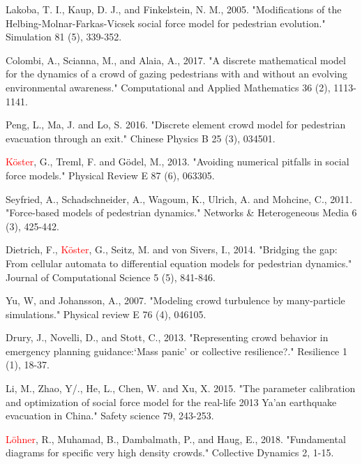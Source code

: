 \documentclass[preprint,12pt]{elsarticle}
\begin{document}
\begin{thebibliography}{10}
Lakoba, T. I., Kaup, D. J., and Finkelstein, N. M., 2005. "Modifications of the 
Helbing-Molnar-Farkas-Vicsek social force model for pedestrian evolution." 
Simulation 81 (5), 339-352.
{}

Colombi, A., Scianna, M., and Alaia, A., 2017. "A discrete 
mathematical model for the dynamics of a crowd of gazing pedestrians with and 
without an evolving environmental awareness." Computational and Applied 
Mathematics 36 (2), 1113-1141.
{}

Peng, L., Ma, J. and Lo, S. 2016. "Discrete element crowd model for 
pedestrian evacuation through an exit." Chinese Physics B 25 (3), 034501.
{}

\textcolor{red}{K\"oster}, G., Treml, F. and G\"odel, M., 2013. "Avoiding 
numerical pitfalls in social force models." Physical Review E 87 (6), 063305.
{}

Seyfried, A., Schadschneider, A., Wagoum, K., Ulrich, A. and Mohcine, C., 
2011. "Force-based models of pedestrian dynamics." Networks 
\& Heterogeneous Media 6 (3), 425-442.
{}

Dietrich, F., \textcolor{red}{K\"oster}, G., Seitz, M. and 
von Sivers, I., 2014. "Bridging the gap: From cellular automata to 
differential equation models for pedestrian dynamics." Journal of Computational 
Science 5 (5), 841-846.{}

Yu, W, and Johansson, A., 2007. "Modeling crowd turbulence by many-particle 
simulations." Physical review E 76 (4), 046105.
{}

Drury, J., Novelli, D., and Stott, C., 2013. "Representing crowd behavior in 
emergency planning guidance:‘Mass panic’ or collective resilience?." Resilience 
1 (1), 18-37.
{}

Li, M., Zhao, Y/., He, L., Chen, W. and Xu, X. 
2015. "The parameter calibration and optimization of social force model for the 
real-life 2013 Ya’an earthquake evacuation in China." Safety science 79, 
243-253.
{}

\textcolor{red}{L\"ohner}, R., Muhamad, B., Dambalmath, P., and Haug, E., 2018. 
"Fundamental diagrams for specific very high density crowds." Collective 
Dynamics 2, 1-15.
{}


\end{thebibliography}
\end{document}
